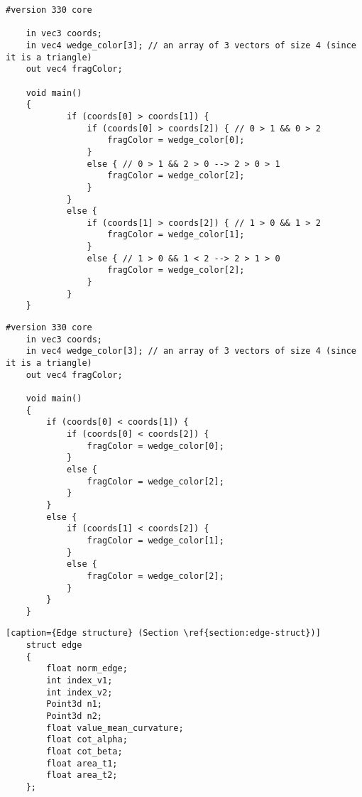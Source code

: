 \begin{lstlisting}[caption={Max diagram - Vertex area (Section: \ref{section:max-diagram})\label{appendix:max-diagram}}]
    #version 330 core

    in vec3 coords;
    in vec4 wedge_color[3]; // an array of 3 vectors of size 4 (since it is a triangle)
    out vec4 fragColor;

    void main()
    {
            if (coords[0] > coords[1]) {
                if (coords[0] > coords[2]) { // 0 > 1 && 0 > 2
                    fragColor = wedge_color[0];
                }
                else { // 0 > 1 && 2 > 0 --> 2 > 0 > 1
                    fragColor = wedge_color[2];
                }
            }
            else {
                if (coords[1] > coords[2]) { // 1 > 0 && 1 > 2
                    fragColor = wedge_color[1];
                }
                else { // 1 > 0 && 1 < 2 --> 2 > 1 > 0
                    fragColor = wedge_color[2];
                }
            }
    }
\end{lstlisting}

\vspace{10pt}

\begin{lstlisting}[caption={Min diagram - Edge area (Section: \ref{section:min-diagram})\label{appendix:min-diagram}}]
    #version 330 core
    in vec3 coords;
    in vec4 wedge_color[3]; // an array of 3 vectors of size 4 (since it is a triangle)
    out vec4 fragColor;

    void main()
    {
        if (coords[0] < coords[1]) {
            if (coords[0] < coords[2]) {
                fragColor = wedge_color[0];
            }
            else {
                fragColor = wedge_color[2];
            }
        }
        else {
            if (coords[1] < coords[2]) {
                fragColor = wedge_color[1];
            }
            else {
                fragColor = wedge_color[2];
            }
        }
    }
\end{lstlisting}
\vspace{10pt}

\begin{lstlisting}[caption={Edge structure} (Section \ref{section:edge-struct})]
    struct edge
    {
        float norm_edge;
        int index_v1;
        int index_v2;
        Point3d n1;
        Point3d n2;
        float value_mean_curvature;
        float cot_alpha;
        float cot_beta;
        float area_t1;
        float area_t2;
    };
\end{lstlisting} \label{Pseudocode:edge}

